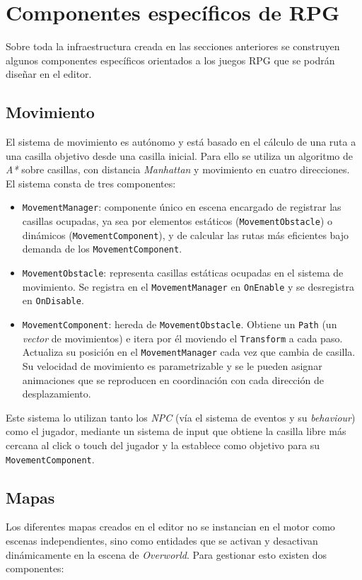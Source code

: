 \section{Componentes específicos de RPG}
Sobre toda la infraestructura creada en las secciones anteriores se construyen algunos componentes específicos orientados a los juegos RPG que se podrán diseñar en el editor. 

\subsection{Movimiento}
El sistema de movimiento es autónomo y está basado en el cálculo de una ruta a una casilla objetivo desde una casilla inicial. Para ello se utiliza un algoritmo de \textit{A*} sobre casillas, con distancia \textit{Manhattan} y movimiento en cuatro direcciones. El sistema consta de tres componentes: 

\begin{itemize}
	\item \texttt{MovementManager}: componente único en escena encargado de registrar las casillas ocupadas, ya sea por elementos estáticos (\texttt{MovementObstacle}) o dinámicos (\texttt{MovementComponent}), y de calcular las rutas más eficientes bajo demanda de los \texttt{MovementComponent}. 
	\item \texttt{MovementObstacle}: representa casillas estáticas ocupadas en el sistema de movimiento. Se registra en el \texttt{MovementManager} en \texttt{OnEnable} y se desregistra en \texttt{OnDisable}. 
	\item \texttt{MovementComponent}: hereda de \texttt{MovementObstacle}. Obtiene un \texttt{Path} (un \textit{vector} de movimientos) e itera por él moviendo el \texttt{Transform} a cada paso. Actualiza su posición en el \texttt{MovementManager} cada vez que cambia de casilla. Su velocidad de movimiento es parametrizable y se le pueden asignar animaciones que se reproducen en coordinación con cada dirección de desplazamiento. 
\end{itemize}

Este sistema lo utilizan tanto los \textit{NPC} (vía el sistema de eventos y su \textit{behaviour}) como el jugador, mediante un sistema de input que obtiene la casilla libre más cercana al click o touch del jugador y la establece como objetivo para su \texttt{MovementComponent}. 

\subsection{Mapas}
Los diferentes mapas creados en el editor no se instancian en el motor como escenas independientes, sino como entidades que se activan y desactivan dinámicamente en la escena de \textit{Overworld}. Para gestionar esto existen dos componentes:

